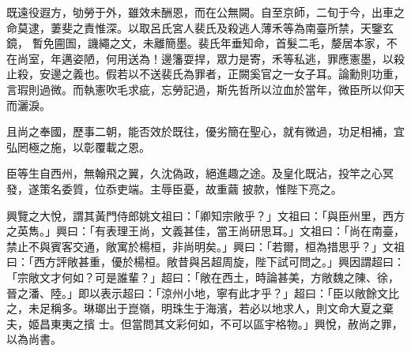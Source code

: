 \begin{pinyinscope}
 既遠役遐方，劬勞于外，雖效未酬恩，而在公無闕。自至京師，二旬于今，出車之命莫逮，萋斐之責惟深。以取呂氏宮人裴氏及殺逃人薄禾等為南臺所禁，天鑒玄鏡，
 暫免圇圄，譏繩之文，未離簡墨。裴氏年垂知命，首髮二毛，嫠居本家，不在尚室，年邁姿陋，何用送為！邊籓耍捍，眾力是寄，禾等私逃，罪應憲墨，以殺止殺，安邊之義也。假若以不送裴氏為罪者，正闕奚官之一女子耳。論勳則功重，言瑕則過微。而執憲吹毛求疵，忘勞記過，斯先哲所以泣血於當年，微臣所以仰天而灑淚。



 且尚之奉國，歷事二朝，能否效於既往，優劣簡在聖心，就有微過，功足相補，宜弘罔極之施，以彰覆載之恩。



 臣等生自西州，無翰飛之翼，久沈偽政，絕進趣之途。及皇化既沾，投竿之心冥發，遂策名委質，位忝吏端。主辱臣憂，故重繭
 披款，惟陛下亮之。



 興覽之大悅，謂其黃門侍郎姚文祖曰：「卿知宗敞乎？」文祖曰：「與臣州里，西方之英雋。」興曰：「有表理王尚，文義甚佳，當王尚研思耳。」文祖曰：「尚在南臺，禁止不與賓客交通，敞寓於楊桓，非尚明矣。」興曰：「若爾，桓為措思乎？」文祖曰：「西方評敞甚重，優於楊桓。敞昔與呂超周旋，陛下試可問之。」興因謂超曰：「宗敞文才何如？可是誰輩？」超曰：「敞在西土，時論甚美，方敞魏之陳、徐，晉之潘、陸。」即以表示超曰：「涼州小地，寧有此才乎？」超曰：「臣以敞餘文比之，未足稱多。琳瑯出于崑嶺，明珠生于海濱，若必以地求人，則文命大夏之棄夫，姬昌東夷之擯
 士。但當問其文彩何如，不可以區宇格物。」興悅，赦尚之罪，以為尚書。



\end{pinyinscope}